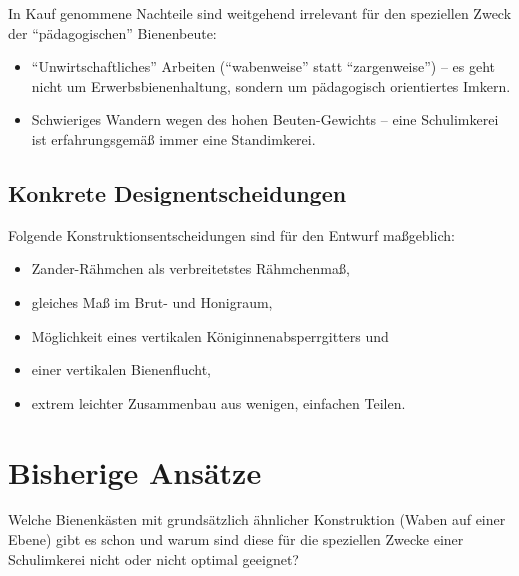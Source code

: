 \documentclass[12pt,a4paper,ngerman]{scrartcl}
\begin{document}
In Kauf genommene Nachteile sind weitgehend irrelevant für den speziellen Zweck der \enquote{pädagogischen} Bienenbeute:

\begin{itemize}
\item \enquote{Unwirtschaftliches} Arbeiten (\enquote{wabenweise} statt \enquote{zargenweise}) -- es geht nicht um Erwerbsbienenhaltung,
  sondern um pädagogisch orientiertes Imkern.
\item Schwieriges Wandern wegen des hohen Beuten-Gewichts -- eine Schulimkerei ist erfahrungsgemäß immer eine Standimkerei.
\end{itemize}


\subsection{Konkrete Designentscheidungen}

Folgende Konstruktionsentscheidungen sind für den Entwurf maßgeblich:

\begin{itemize}
\item Zander-Rähmchen als verbreitetstes Rähmchenmaß,
\item gleiches Maß im Brut- und Honigraum,
\item Möglichkeit eines vertikalen Königinnenabsperrgitters und
\item einer vertikalen Bienenflucht,
\item extrem leichter Zusammenbau aus wenigen, einfachen Teilen.
\end{itemize}


\section{Bisherige Ansätze}

Welche Bienenkästen mit grundsätzlich ähnlicher Konstruktion (Waben auf einer Ebene) gibt es schon und warum sind diese
für die speziellen Zwecke einer Schulimkerei nicht oder nicht optimal geeignet?
\end{document}
